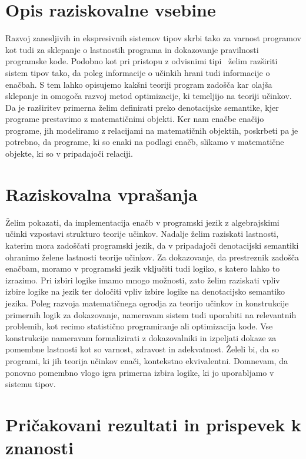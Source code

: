 \documentclass{article}
\begin{document}
\section*{Opis raziskovalne vsebine}

Razvoj zanesljivih in ekspresivnih sistemov tipov skrbi tako za varnost programov kot tudi za sklepanje o lastnostih programa in dokazovanje pravilnosti programske kode. Podobno kot pri pristopu z odvisnimi tipi~\cite{DBLP:journals/pacmpl/Ahman18} želim razširiti sistem tipov tako, da poleg informacije o učinkih hrani tudi informacije o enačbah. S tem lahko opisujemo kakšni teoriji program zadošča kar olajša sklepanje in omogoča razvoj metod optimizacije, ki temeljijo na teoriji učinkov. Da je razširitev primerna želim definirati preko denotacijske semantike, kjer programe prestavimo z matematičnimi objekti. Ker nam enačbe enačijo programe, jih modeliramo z relacijami na matematičnih objektih, poskrbeti pa je potrebno, da programe, ki so enaki na podlagi enačb, slikamo v matematične objekte, ki so v pripadajoči relaciji. 

\section*{Raziskovalna vprašanja}

Želim pokazati, da implementacija enačb v programski jezik z algebrajskimi učinki vzpostavi strukturo teorije učinkov. Nadalje želim raziskati lastnosti, katerim mora zadoščati programski jezik, da v pripadajoči denotacijski semantiki ohranimo želene lastnosti teorije učinkov. Za dokazovanje, da prestreznik zadošča enačbam, moramo v programski jezik vključiti tudi logiko, s katero lahko to izrazimo. Pri izbiri logike imamo mnogo možnosti, zato želim raziskati vpliv izbire logike na jezik ter določiti vpliv izbire logike na denotacijsko semantiko jezika. Poleg razvoja matematičnega ogrodja za teorijo učinkov in konstrukcije primernih logik za dokazovanje, nameravam sistem tudi uporabiti na relevantnih problemih, kot recimo statistično programiranje ali optimizacija kode. Vse konstrukcije nameravam formalizirati z dokazovalniki in izpeljati dokaze za pomembne lastnosti kot so varnost, zdravost in adekvatnost. Želeli bi, da so programi, ki jih teorija učinkov enači, kontekstno ekvivalentni. Domnevam, da ponovno pomembno vlogo igra primerna izbira logike, ki jo uporabljamo v sistemu tipov. 

\section*{Pričakovani rezultati in prispevek k znanosti}
\end{document}
